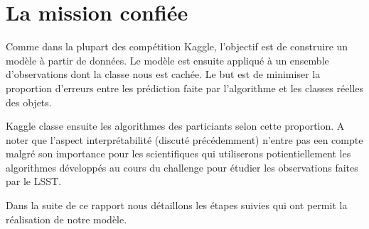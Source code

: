 \section{La mission confiée}

Comme dans la plupart des compétition Kaggle, l'objectif est de construire un modèle à partir de données. Le modèle est ensuite appliqué à un ensemble d'observations dont la classe nous est cachée. Le but est de minimiser la proportion d'erreurs entre les prédiction faite par l'algorithme et les classes réelles des objets. 

Kaggle classe ensuite les algorithmes des particiants selon cette proportion. A noter que l'aspect interprétabilité (discuté précédemment) n'entre pas een compte malgré son importance pour les scientifiques qui utiliserons potientiellement les algorithmes développés au cours du challenge pour étudier les observations faites par le LSST.

Dans la suite de ce rapport nous détaillons les étapes suivies qui ont permit la réalisation de notre modèle. 

